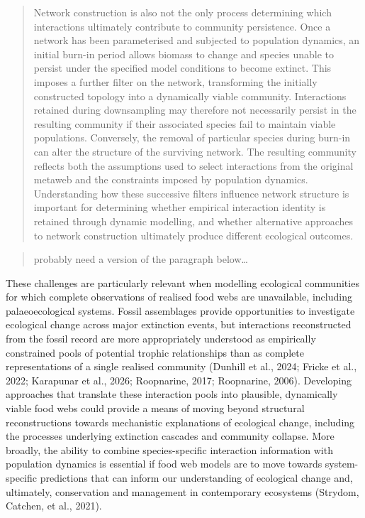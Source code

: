 \documentclass[
]{article}
\begin{document}
\begin{quote}
Network construction is also not the only process determining which
interactions ultimately contribute to community persistence. Once a
network has been parameterised and subjected to population dynamics, an
initial burn-in period allows biomass to change and species unable to
persist under the specified model conditions to become extinct. This
imposes a further filter on the network, transforming the initially
constructed topology into a dynamically viable community. Interactions
retained during downsampling may therefore not necessarily persist in
the resulting community if their associated species fail to maintain
viable populations. Conversely, the removal of particular species during
burn-in can alter the structure of the surviving network. The resulting
community reflects both the assumptions used to select interactions from
the original metaweb and the constraints imposed by population dynamics.
Understanding how these successive filters influence network structure
is important for determining whether empirical interaction identity is
retained through dynamic modelling, and whether alternative approaches
to network construction ultimately produce different ecological
outcomes.
\end{quote}

\begin{quote}
probably need a version of the paragraph below\ldots{}
\end{quote}

These challenges are particularly relevant when modelling ecological
communities for which complete observations of realised food webs are
unavailable, including palaeoecological systems. Fossil assemblages
provide opportunities to investigate ecological change across major
extinction events, but interactions reconstructed from the fossil record
are more appropriately understood as empirically constrained pools of
potential trophic relationships than as complete representations of a
single realised community (Dunhill et al., 2024; Fricke et al., 2022;
Karapunar et al., 2026; Roopnarine, 2017; Roopnarine, 2006). Developing
approaches that translate these interaction pools into plausible,
dynamically viable food webs could provide a means of moving beyond
structural reconstructions towards mechanistic explanations of
ecological change, including the processes underlying extinction
cascades and community collapse. More broadly, the ability to combine
species-specific interaction information with population dynamics is
essential if food web models are to move towards system-specific
predictions that can inform our understanding of ecological change and,
ultimately, conservation and management in contemporary ecosystems
(Strydom, Catchen, et al., 2021).
\end{document}
